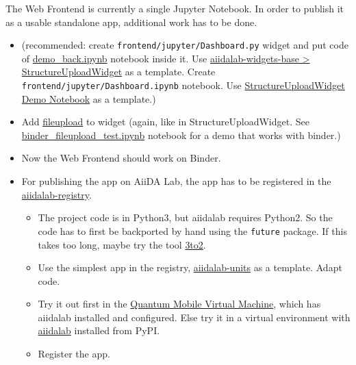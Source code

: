 The Web Frontend is currently a single Jupyter Notebook. In order to
publish it as a usable standalone app, additional work has to be done.

\begin{itemize}
    \tightlist
\item
    (recommended: create \texttt{frontend/jupyter/Dashboard.py} widget and
    put code of
    \href{./frontend/jupyter/demo/demo_backend.ipynb}{demo\_back.ipynb}
    notebook inside it. Use
    \href{https://github.com/aiidalab/aiidalab-widgets-base/blob/master/aiidalab_widgets_base/structures.py}{aiidalab-widgets-base
      > StructureUploadWidget} as a template. Create
    \texttt{frontend/jupyter/Dashboard.ipynb} notebook. Use
    \href{https://github.com/aiidalab/aiidalab-widgets-base/blob/master/structures.ipynb}{StructureUploadWidget
      Demo Notebook} as a template.)
\item
    Add \href{https://pypi.org/project/fileupload/}{fileupload} to widget
    (again, like in StructureUploadWidget. See
    \href{./frontend/jupyter/demo/binder_fileupload_test.ipynb}{binder\_fileupload\_test.ipynb}
    notebook for a demo that works with binder.)
\item
    Now the Web Frontend should work on Binder.
\item
    For publishing the app on AiiDA Lab, the app has to be registered in
    the
    \href{https://github.com/aiidalab/aiidalab-registry}{aiidalab-registry}.

    \begin{itemize}
        \tightlist
    \item
        The project code is in Python3, but aiidalab requires Python2. So
        the code has to first be backported by hand using the \texttt{future}
        package. If this takes too long, maybe try the tool
        \href{https://pypi.org/project/3to2/}{3to2}.
    \item
        Use the simplest app in the registry,
        \href{https://github.com/aiidalab/aiidalab-units}{aiidalab-units} as
        a template. Adapt code.
    \item
        Try it out first in the
        \href{https://www.materialscloud.org/work/quantum-mobile}{Quantum
          Mobile Virtual Machine}, which has aiidalab installed and
        configured. Else try it in a virtual environment with
        \href{https://pypi.org/project/aiidalab/}{aiidalab} installed from
        PyPI.
    \item
        Register the app.
    \end{itemize}
\end{itemize}

